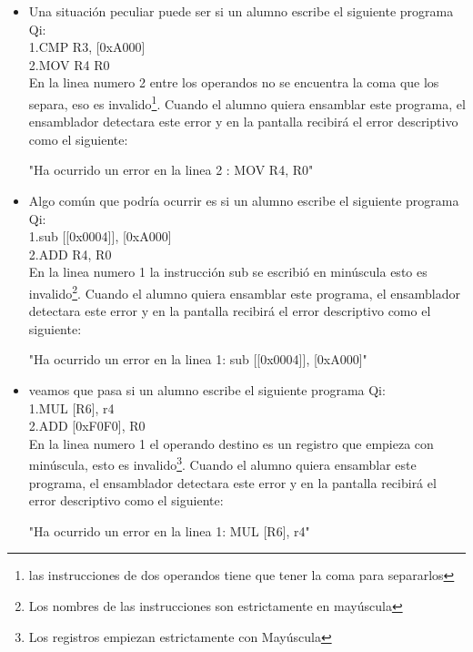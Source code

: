 \begin{itemize}
"Ha ocurrido un error en la linea 1 : ADD R0, [0x0002]" \\ 

\item Una situación peculiar puede ser si un alumno escribe el siguiente programa Qi:\\

1.CMP R3, [0xA000] \\
2.MOV R4 R0 \\

En la linea numero 2 entre los operandos no se encuentra la coma que los separa, eso es invalido\footnote{las instrucciones de dos operandos tiene que tener la coma para separarlos}. Cuando el alumno quiera ensamblar este programa, el ensamblador detectara este error y en la pantalla recibirá el error descriptivo como el siguiente:

"Ha ocurrido un error en la linea 2 : MOV R4, R0" \\ 

\item Algo común que podría ocurrir es si un alumno escribe el siguiente programa Qi:\\

1.sub [[0x0004]], [0xA000] \\
2.ADD R4, R0 \\

En la linea numero 1 la instrucción sub se escribió en minúscula esto es invalido\footnote{Los nombres de las instrucciones son estrictamente en mayúscula}. Cuando el alumno quiera ensamblar este programa, el ensamblador detectara este error y en la pantalla recibirá el error descriptivo como el siguiente:

"Ha ocurrido un error en la linea 1: sub [[0x0004]], [0xA000]" \\ 

\item veamos que pasa si un alumno escribe el siguiente programa Qi:\\

1.MUL [R6], r4 \\
2.ADD [0xF0F0], R0 \\

En la linea numero 1 el operando destino es un registro que empieza con minúscula, esto es invalido\footnote{Los registros empiezan estrictamente con Mayúscula}. Cuando el alumno quiera ensamblar este programa, el ensamblador detectara este error y en la pantalla recibirá el error descriptivo como el siguiente:

"Ha ocurrido un error en la linea 1: MUL [R6], r4" \\ 


\end{itemize}
